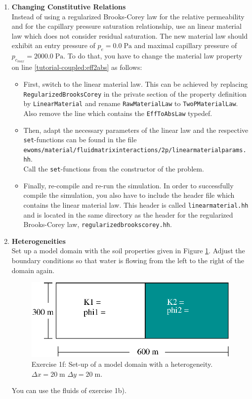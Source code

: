 \begin{enumerate}
\item \textbf{Changing Constitutive Relations} \\
  Instead of using a regularized Brooks-Corey law for the relative
  permeability and for the capillary pressure saturation relationship,
  use an linear material law which does not consider residual
  saturation. The new material law should exhibit an entry pressure of
  $p_e = 0.0\;\text{Pa}$ and maximal capillary pressure of
  $p_{c_{max}} = 2000.0\;\text{Pa}$. To do that, you have to change
  the material law property on line
  \ref{tutorial-coupled:eff2abs} as follows:
\begin{itemize}
\item First, switch to the linear material law. This can be achieved
  by replacing \texttt{RegularizedBrooksCorey} in the private section
  of the property definition by \texttt{LinearMaterial} and rename
  \texttt{RawMaterialLaw} to \texttt{TwoPMaterialLaw}. Also remove the
  line which contains the \texttt{EffToAbsLaw} typedef.
\item Then, adapt the necessary parameters of the linear law and the
  respective \texttt{set}-functions can be found in the file
  \texttt{ewoms/material/fluidmatrixinteractions/2p/linearmaterialparams.hh}.\\
  Call the \texttt{set}-functions from the constructor of the problem.
\item Finally, re-compile and re-run the simulation. In order to
  successfully compile the simulation, you also have to include the
  header file which contains the linear material law. This header is
  called \texttt{linearmaterial.hh} and is located in the same
  directory as the header for the regularized Brooks-Corey law,
  \texttt{regularizedbrookscorey.hh}.
\end{itemize}
 
\item \textbf{Heterogeneities}  \\
  Set up a model domain with the soil properties given in Figure
  \ref{tutorial-coupled:exercise1_d}. Adjust the boundary conditions
  so that water is flowing from the left to the right of the domain again.
\begin{figure}[ht]
\centering
\includegraphics[width=0.5\linewidth,keepaspectratio]{EPS/exercise1_c.eps}
\caption{Exercise 1f: Set-up of a model domain with a heterogeneity. $\Delta x = 20 \;\text{m}$ $\Delta y = 20\;\text{m}$.}\label{tutorial-coupled:exercise1_d}
\end{figure}
You can use the fluids of exercise 1b).


\end{enumerate}
